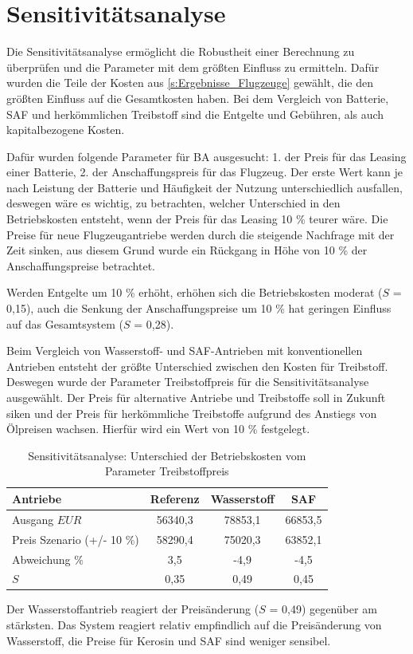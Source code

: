 \section{Sensitivitätsanalyse}
\label{s:Sensitivitätsanalyse}
%
Die Sensitivitätsanalyse ermöglicht die Robustheit einer Berechnung zu überprüfen 
und die Parameter mit dem größten Einfluss zu ermitteln. 
Dafür wurden die Teile der Kosten aus \ref{s:Ergebnisse_Flugzeuge} gewählt, 
die den größten Einfluss auf die Gesamtkosten haben. 
Bei dem Vergleich von Batterie, SAF und herkömmlichen Treibstoff 
sind die Entgelte und Gebühren, als auch kapitalbezogene Kosten. %

Dafür wurden folgende Parameter für BA ausgesucht: 
1. der Preis für das Leasing einer Batterie, 
2. der Anschaffungspreis für das Flugzeug.
Der erste Wert kann je nach Leistung der Batterie und Häufigkeit der Nutzung unterschiedlich ausfallen, 
deswegen wäre es wichtig, zu betrachten, welcher Unterschied in den Betriebskosten entsteht, 
wenn der Preis für das Leasing 10 \% teurer wäre. 
Die Preise für neue Flugzeugantriebe werden durch die steigende Nachfrage mit der Zeit sinken, 
aus diesem Grund wurde ein Rückgang in Höhe von 10 \% der Anschaffungspreise betrachtet.

Werden Entgelte um 10 \% erhöht, erhöhen sich die Betriebskosten moderat ($S$ = 0,15), 
auch die Senkung der Anschaffungspreise um 10 \% hat geringen Einfluss auf das Gesamtsystem ($S$ = 0,28).

Beim Vergleich von Wasserstoff- und SAF-Antrieben mit konventionellen Antrieben 
entsteht der größte Unterschied zwischen den Kosten für Treibstoff. 
Deswegen wurde der Parameter \glqq Treibstoffpreis \grqq{} für die Sensitivitätsanalyse ausgewählt.
Der Preis für alternative Antriebe und Treibstoffe soll in Zukunft siken und der Preis 
für herkömmliche Treibstoffe aufgrund des Anstiegs von Ölpreisen wachsen. 
Hierfür wird ein Wert von 10 \% festgelegt.

\begin{table}[h]
	\begin{center}
    \caption{Sensitivitätsanalyse: Unterschied der Betriebskosten vom Parameter Treibstoffpreis}
	\label{BA_Infrastrukturtab}
	\begin{tabular}{|l|c|c|c|}
		\hline
		Antriebe & \textbf{Referenz}& \textbf{Wasserstoff}& \textbf{SAF} \\ \hline
		Ausgang $EUR$ & 56340,3 & 78853,1 & 66853,5  \\ \hline
        Preis Szenario (+/- 10 \%) & 58290,4  & 75020,3 & 63852,1 \\ \hline
        Abweichung $\%$ & 3,5 & -4,9 & -4,5 \\ \hline
		$S$ & 0,35 & 0,49 & 0,45 \\ \hline
	\end{tabular}
    \end{center}
\end{table}

Der Wasserstoffantrieb reagiert der Preisänderung ($S$ = 0,49) gegenüber am stärksten. 
Das System reagiert relativ empfindlich auf die Preisänderung von Wasserstoff, 
die Preise für Kerosin und SAF sind weniger sensibel.
